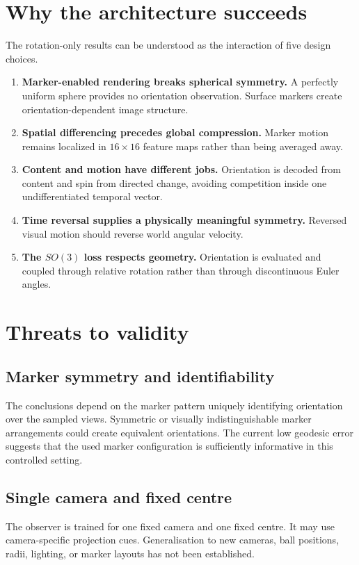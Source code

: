 \documentclass[11pt,a4paper]{article}
\begin{document}
\section{Why the architecture succeeds}
The rotation-only results can be understood as the interaction of five design choices.

\begin{enumerate}[leftmargin=*]
\item \textbf{Marker-enabled rendering breaks spherical symmetry.} A perfectly uniform sphere provides no orientation observation. Surface markers create orientation-dependent image structure.
\item \textbf{Spatial differencing precedes global compression.} Marker motion remains localized in $16\times16$ feature maps rather than being averaged away.
\item \textbf{Content and motion have different jobs.} Orientation is decoded from content and spin from directed change, avoiding competition inside one undifferentiated temporal vector.
\item \textbf{Time reversal supplies a physically meaningful symmetry.} Reversed visual motion should reverse world angular velocity.
\item \textbf{The $SO(3)$ loss respects geometry.} Orientation is evaluated and coupled through relative rotation rather than through discontinuous Euler angles.
\end{enumerate}

\section{Threats to validity}
\subsection{Marker symmetry and identifiability}
The conclusions depend on the marker pattern uniquely identifying orientation over the sampled views. Symmetric or visually indistinguishable marker arrangements could create equivalent orientations. The current low geodesic error suggests that the used marker configuration is sufficiently informative in this controlled setting.

\subsection{Single camera and fixed centre}
The observer is trained for one fixed camera and one fixed centre. It may use camera-specific projection cues. Generalisation to new cameras, ball positions, radii, lighting, or marker layouts has not been established.
\end{document}
